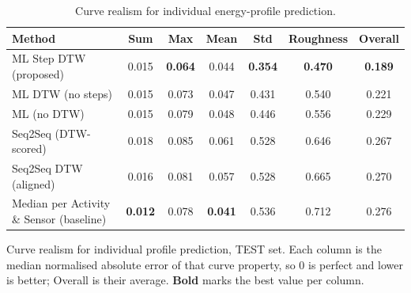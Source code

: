 \begin{table}[H]
\centering

\begin{minipage}{16cm}
\centering

\captionsetup{
    justification=centering,
    singlelinecheck=false,
    format=plain
}

\caption{Curve realism for individual energy-profile prediction.}
\label{tab:individual_profile_realism}

\vspace{-0.5em}

\begin{tabular}{p{6cm}cccccc}
\toprule
Method & Sum & Max & Mean & Std & Roughness & Overall \\
\midrule
ML Step DTW (proposed) & 0.015 & \textbf{0.064} & 0.044 & \textbf{0.354} & \textbf{0.470} & \textbf{0.189} \\
ML DTW (no steps) & 0.015 & 0.073 & 0.047 & 0.431 & 0.540 & 0.221 \\
ML (no DTW) & 0.015 & 0.079 & 0.048 & 0.446 & 0.556 & 0.229 \\
Seq2Seq (DTW-scored) & 0.018 & 0.085 & 0.061 & 0.528 & 0.646 & 0.267 \\
Seq2Seq DTW (aligned) & 0.016 & 0.081 & 0.057 & 0.528 & 0.665 & 0.270 \\
Median per Activity \& Sensor (baseline) & \textbf{0.012} & 0.078 & \textbf{0.041} & 0.536 & 0.712 & 0.276 \\
\bottomrule
\end{tabular}

\vspace{0.5em}

\parbox{16cm}{%
\footnotesize
Curve realism for individual profile prediction, TEST set. Each column is the median normalised absolute error of that curve property, so 0 is perfect and lower is better; Overall is their average.
\textbf{Bold} marks the best value per column.
}

\end{minipage}

\end{table}
